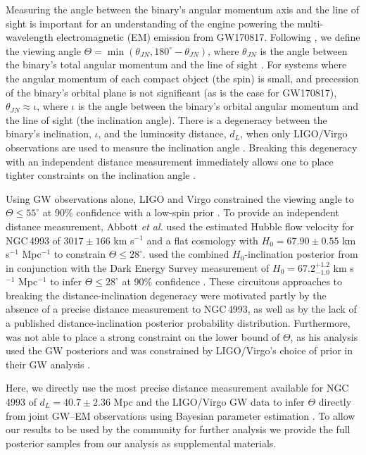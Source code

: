Measuring the angle between the binary's angular momentum axis and the line of sight is important for an understanding of the engine powering the multi-wavelength electromagnetic (EM) emission from GW170817.  Following \cite{TheLIGOScientific:2017qsa}, we define the viewing angle  $\Theta=\min(\theta_{JN},180^\circ - \theta_{JN})$, where $\theta_{JN}$ is the angle between the binary's total angular momentum and the line of sight \cite{TheLIGOScientific:2017qsa}. For systems where the angular momentum of each compact object (the spin) is small, and precession of the binary's orbital plane is not significant (as is the case for GW170817), $\theta_{JN} \approx \iota$, where $\iota$ is the angle between the binary's orbital angular momentum and the line of sight (the inclination angle). There is a degeneracy between the binary's inclination, $\iota$, and the luminosity distance, $d_L$, when only LIGO/Virgo observations are used to measure the inclination angle \cite{Wahlquist:1987rx}. Breaking this degeneracy with an independent distance measurement immediately allows one to place tighter constraints on the inclination angle \cite{Fan:2014kka}.

Using GW observations alone, LIGO and Virgo constrained the viewing angle to $\Theta \le 55^\circ$ at 90\% confidence with a low-spin prior \cite{TheLIGOScientific:2017qsa}. To provide an independent distance measurement, Abbott {\it et al.} used the estimated Hubble flow velocity for NGC\,4993 of $3017\pm 166$ km s$^{-1}$ and a flat cosmology with $H_0=67.90\pm 0.55$ km s$^{-1}$ Mpc$^{-1}$ to constrain $\Theta\le 28^\circ$\cite{TheLIGOScientific:2017qsa}. \cite{Mandel:2017fwk} used the combined $H_0$-inclination posterior from \cite{Abbott:2017xzu} in conjunction with the Dark Energy Survey measurement of $H_0=67.2^{+1.2}_{-1.0}$ km s$^{-1}$ Mpc$^{-1}$ \cite{Abbott:2017smn} to infer $\Theta\le 28^\circ$ at 90\% confidence \cite{Mandel:2017fwk}. These circuitous approaches to breaking the distance-inclination degeneracy were motivated partly by the absence of a precise distance measurement to NGC\,4993, as well as by the lack of a published distance-inclination posterior probability distribution. Furthermore, \cite{Mandel:2017fwk} was not able to place a strong constraint on the lower bound of $\Theta$, as his analysis used the GW posteriors \cite{Mandel:2017fwk} and was constrained by LIGO/Virgo's choice of prior in their GW analysis \cite{Abbott:2017xzu}. 

Here, we directly use the most precise distance measurement available for NGC\,4993 of $d_L=40.7\pm 2.36$ Mpc \cite{Cantiello:2018ffy} and the LIGO/Virgo GW data \cite{TheLIGOScientific:2017qsa} to infer $\Theta$ directly from joint GW--EM observations using Bayesian parameter estimation \cite{emcee,pycbc-inference,pycbc-software}. To allow our results to be used by the community for further analysis we provide the full posterior samples from our analysis as supplemental materials.

